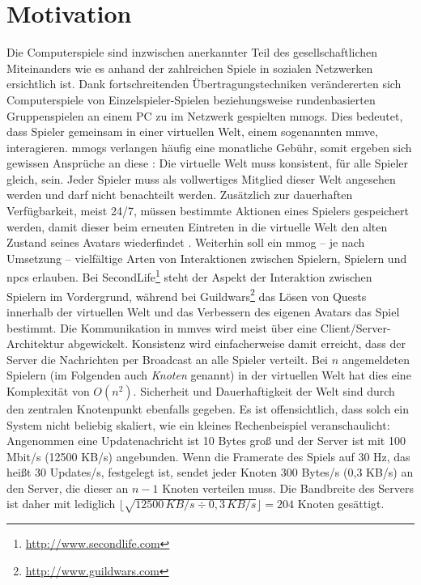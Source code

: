 \chapter{Motivation}
\label{chap:einleitung}
Die Computerspiele sind inzwischen anerkannter Teil des gesellschaftlichen Miteinanders wie es anhand der zahlreichen Spiele in sozialen Netzwerken ersichtlich ist. Dank fortschreitenden Übertragungs\-techniken verändererten sich Computerspiele von Einzelspieler-Spielen beziehungsweise rundenbasierten Gruppenspielen an einem PC zu im Netzwerk gespielten \acp{mmog}. Dies bedeutet, dass Spieler gemeinsam in einer virtuellen Welt, einem sogenannten \ac{mmve}, interagieren. \acp{mmog} verlangen häufig eine monatliche Gebühr, somit ergeben sich gewissen Ansprüche an diese \cite{Fischer2010a}: Die virtuelle Welt muss konsistent, für alle Spieler gleich, sein. Jeder Spieler muss als vollwertiges Mitglied dieser Welt angesehen werden und darf nicht benachteilt werden. Zusätzlich zur dauerhaften Verfügbarkeit, meist 24/7, müssen bestimmte Aktionen eines Spielers gespeichert werden, damit dieser beim erneuten Eintreten in die virtuelle Welt den alten Zustand seines Avatars wiederfindet \cite{Zhang2008Persistence}. Weiterhin soll ein \ac{mmog} -- je nach Umsetzung -- vielfältige Arten von Interaktionen zwischen Spielern, Spielern und \acp{npc} erlauben. Bei SecondLife\footnote{\url{http://www.secondlife.com}} steht der Aspekt der Interaktion zwischen Spielern im Vordergrund, während bei Guildwars\footnote{\url{http://www.guildwars.com}} das Lösen von Quests innerhalb der virtuellen Welt und das Verbessern des eigenen Avatars das Spiel bestimmt.
Die Kommunikation in \acp{mmve} wird meist über eine Client/Server-Architektur abgewickelt. Konsistenz wird einfacherweise damit erreicht, dass der Server die Nachrichten per Broadcast an alle Spieler verteilt. Bei $n$ angemeldeten Spielern (im Folgenden auch \emph{Knoten} genannt) in der virtuellen Welt hat dies eine Komplexität von $O(n^2)$. Sicherheit und Dauerhaftigkeit der Welt sind durch den zentralen Knotenpunkt ebenfalls gegeben. Es ist offensichtlich, dass solch ein System nicht beliebig skaliert, wie ein kleines Rechenbeispiel veranschaulicht: Angenommen eine Updatenachricht ist 10 Bytes groß und der Server ist mit 100 Mbit/s (12500 KB/s) angebunden. Wenn die Framerate des Spiels auf 30 Hz, das heißt 30 Updates/s, festgelegt ist, sendet jeder Knoten 300 Bytes/s (0,3 KB/s) an den Server, die dieser an $n-1$ Knoten verteilen muss. Die Bandbreite des Servers ist daher mit lediglich $\lfloor\sqrt{12500\,KB/s \div 0,3\,KB/s}\rfloor = 204$ Knoten gesättigt.
